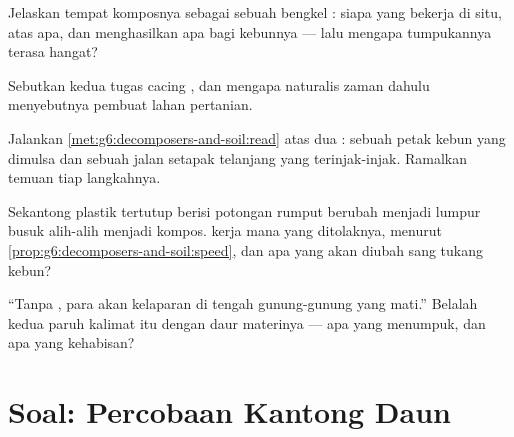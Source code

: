 \begin{exercise}[$\star\star$]\label{exo:g6:decomposers-and-soil:8}
Jelaskan tempat komposnya sebagai sebuah bengkel : siapa yang
bekerja di situ, atas apa, dan menghasilkan apa bagi kebunnya --- lalu
mengapa tumpukannya terasa hangat?
\end{exercise}

\begin{exercise}[$\star\star$]\label{exo:g6:decomposers-and-soil:9}
Sebutkan kedua tugas cacing , dan mengapa naturalis zaman dahulu
menyebutnya pembuat lahan pertanian.
\end{exercise}

\begin{exercise}[$\star\star$]\label{exo:g6:decomposers-and-soil:10}
Jalankan \cref{met:g6:decomposers-and-soil:read} atas dua :
sebuah petak kebun yang dimulsa dan sebuah jalan setapak telanjang
yang terinjak-injak. Ramalkan temuan tiap langkahnya.
\end{exercise}

\begin{exercise}[$\star\star$]\label{exo:g6:decomposers-and-soil:11}
Sekantong plastik tertutup berisi potongan rumput berubah menjadi
lumpur busuk alih-alih menjadi kompos.  kerja mana yang
ditolaknya, menurut \cref{prop:g6:decomposers-and-soil:speed}, dan apa
yang akan diubah sang tukang kebun?
\end{exercise}

\begin{exercise}[$\star\star\star$]\label{exo:g6:decomposers-and-soil:12}
``Tanpa , para  akan kelaparan di tengah gunung-gunung
yang mati.'' Belalah kedua paruh kalimat itu dengan daur materinya ---
apa yang menumpuk, dan apa yang kehabisan?
\end{exercise}

\section{Soal: Percobaan Kantong Daun}

